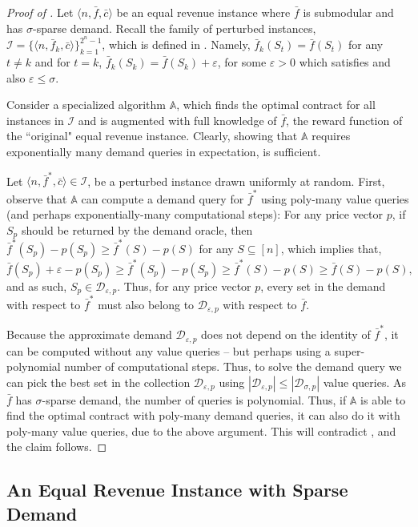\documentclass[11pt]{article}
\newcommand{\eps}{\varepsilon}
\newcommand{\A}{\mathbb{A}}
\newcommand{\I}{\mathcal{I}}
\newcommand{\feq}{\bar{f}}
\newcommand{\ceq}{\bar{c}}
\newcommand{\demand}[2]{\mathcal{D}_{{#1},{#2}}}
\newcommand{\demSigP}{\demand{\sigma}{p}}
\newcommand{\perturbedInst}{\langle n,\feq_k,\ceq \rangle}
\newcommand{\familyI}{\I = \{ \perturbedInst \}_{k=1}^{2^n-1}}
\begin{document}
\begin{proof}[Proof of ]
    Let $\langle n,\feq,\ceq\rangle$ be an equal revenue instance where $\feq$ is submodular and has $\sigma$-sparse demand.
    Recall the family of perturbed instances, $\familyI$, which is defined in . Namely, $\feq_k(S_t) = \feq(S_t)$ for any $t \ne k$ and for $t=k$, $\feq_k(S_k) = \feq(S_k) + \eps$, for some $\eps>0$ which satisfies  and also $\eps \le \sigma$.
    
    Consider a specialized algorithm $\A$, which finds the optimal contract for all instances in $\I$ and is augmented with full knowledge of $\feq$, the reward function of the ``original" equal revenue instance.
    Clearly, showing that $\A$ requires exponentially many demand queries in expectation, is sufficient.
    
    Let $\langle n,\feq^*,\ceq\rangle \in \I$, be a perturbed instance drawn uniformly at random.
    First, observe that $\A$ can compute a demand query for $\feq^*$ using poly-many value queries (and perhaps exponentially-many computational steps):
    For any price vector $p$, if $S_p$ should be returned by the demand oracle, then $\feq^*(S_p) - p(S_p) \ge \feq^*(S)- p(S)$ for any $S \subseteq [n]$, which implies that,
    $$
    \feq(S_p) + \eps - p(S_p) \ge \feq^*(S_p) - p(S_p) \ge \feq^*(S)- p(S) \ge \feq(S)- p(S),
    $$
    and as such, $S_p \in \demand{\eps}{p}$. 
    Thus, for any price vector $p$, every set in the demand with respect to $\feq^*$ must also belong to $\demand{\eps}{p}$ with respect to $\feq$.
    
    Because the approximate demand $\demand{\eps}{p}$ does not depend on the identity of $\feq^*$, it can be computed without any value queries -- but perhaps using a super-polynomial number of computational steps.
    Thus, to solve the demand query we can pick the best set in the collection $\demand{\eps}{p}$ using $|\demand{\eps}{p}| \le |\demSigP|$ value queries. As $\feq$ has $\sigma$-sparse demand, the number of queries is polynomial.
    Thus, if $\A$ is able to find the optimal contract with poly-many demand queries, it can also do it with poly-many value queries, due to the above argument. This will contradict , and the claim follows.
\end{proof}

\subsection{An Equal Revenue Instance with Sparse Demand}\label{sec:eqRevWithSparse}
\end{document}
